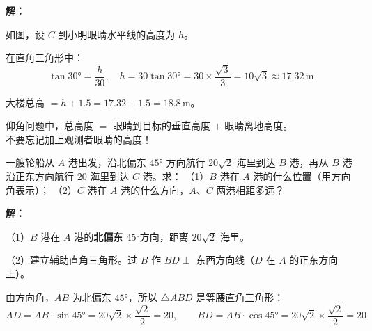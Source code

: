 \documentclass[12pt, a4paper]{ctexart}
\begin{document}
\textbf{解：}

如图，设 $C$ 到小明眼睛水平线的高度为 $h$。

在直角三角形中：
\[
\tan 30° = \frac{h}{30},\quad h = 30\tan 30° = 30 \times \frac{\sqrt{3}}{3} = 10\sqrt{3} \approx 17.32\,\text{m}
\]

大楼总高 $= h + 1.5 = 17.32 + 1.5 = \boxed{18.8\,\text{m}}$。

\begin{warnbox}[易错提醒]
仰角问题中，总高度 $=$ 眼睛到目标的垂直高度 $+$ 眼睛离地高度。\\
不要忘记加上观测者眼睛的高度！
\end{warnbox}

\begin{appbox}
一艘轮船从 $A$ 港出发，沿北偏东 $45°$ 方向航行 $20\sqrt{2}$ 海里到达 $B$ 港，再从 $B$ 港沿正东方向航行 $20$ 海里到达 $C$ 港。求：
（1）$B$ 港在 $A$ 港的什么位置（用方向角表示）；
（2）$C$ 港在 $A$ 港的什么方向，$A$、$C$ 两港相距多远？

\medskip
\begin{center}
\end{center}
\end{appbox}

\textbf{解：}

（1）$B$ 港在 $A$ 港的\textbf{北偏东 $45°$}方向，距离 $20\sqrt{2}$ 海里。

（2）建立辅助直角三角形。过 $B$ 作 $BD \perp$ 东西方向线（$D$ 在 $A$ 的正东方向上）。

由方向角，$AB$ 为北偏东 $45°$，所以 $\triangle ABD$ 是等腰直角三角形：
\[
AD = AB \cdot \sin 45° = 20\sqrt{2} \times \frac{\sqrt{2}}{2} = 20,\qquad
BD = AB \cdot \cos 45° = 20\sqrt{2} \times \frac{\sqrt{2}}{2} = 20
\]
\end{document}
